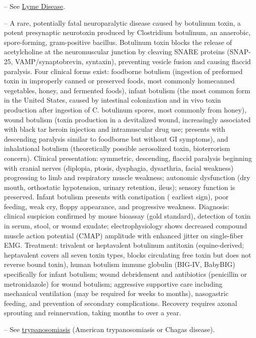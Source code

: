 -- See \hyperlink{Lyme Disease}{Lyme Disease}.

-- A rare, potentially fatal neuroparalytic disease caused by botulinum toxin, a potent presynaptic neurotoxin produced by Clostridium botulinum, an anaerobic, spore-forming, gram-positive bacillus. Botulinum toxin blocks the release of acetylcholine at the neuromuscular junction by cleaving SNARE proteins (SNAP-25, VAMP/synaptobrevin, syntaxin), preventing vesicle fusion and causing flaccid paralysis. Four clinical forms exist: foodborne botulism (ingestion of preformed toxin in improperly canned or preserved foods, most commonly homecanned vegetables, honey, and fermented foods), infant botulism (the most common form in the United States, caused by intestinal colonization and in vivo toxin production after ingestion of C. botulinum spores, most commonly from honey), wound botulism (toxin production in a devitalized wound, increasingly associated with black tar heroin injection and intramuscular drug use; presents with descending paralysis similar to foodborne but without GI symptoms), and inhalational botulism (theoretically possible aerosolized toxin, bioterrorism concern). Clinical presentation: symmetric, descending, flaccid paralysis beginning with cranial nerves (diplopia, ptosis, dysphagia, dysarthria, facial weakness) progressing to limb and respiratory muscle weakness; autonomic dysfunction (dry mouth, orthostatic hypotension, urinary retention, ileus); sensory function is preserved. Infant botulism presents with constipation ( earliest sign), poor feeding, weak cry, floppy appearance, and progressive weakness. Diagnosis: clinical suspicion confirmed by mouse bioassay (gold standard), detection of toxin in serum, stool, or wound exudate; electrophysiology shows decreased compound muscle action potential (CMAP) amplitude with enhanced jitter on single-fiber EMG. Treatment: trivalent or heptavalent botulinum antitoxin (equine-derived; heptavalent covers all seven toxin types, blocks circulating free toxin but does not reverse bound toxin), human botulism immune globulin (BIG-IV, BabyBIG) specifically for infant botulism; wound debridement and antibiotics (penicillin or metronidazole) for wound botulism; aggressive supportive care including mechanical ventilation (may be required for weeks to months), nasogastric feeding, and prevention of secondary complications. Recovery requires axonal sprouting and reinnervation, taking months to over a year.

-- See \hyperlink{Trypanosomiasis}{trypanosomiasis} (American trypanosomiasis or Chagas disease).

